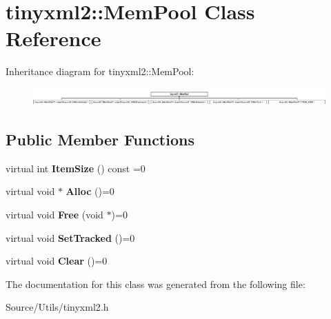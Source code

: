 \hypertarget{classtinyxml2_1_1_mem_pool}{}\section{tinyxml2\+:\+:Mem\+Pool Class Reference}
\label{classtinyxml2_1_1_mem_pool}
Inheritance diagram for tinyxml2\+:\+:Mem\+Pool\+:\begin{figure}[H]
\begin{center}
\leavevmode
\includegraphics[height=0.691358cm]{classtinyxml2_1_1_mem_pool}
\end{center}
\end{figure}
\subsection*{Public Member Functions}
\begin{DoxyCompactItemize}
\item 
\mbox{\label{classtinyxml2_1_1_mem_pool_a0c518d49e3a94bde566f61e13b7240bb}} 
virtual int {\bfseries Item\+Size} () const =0
\item 
\mbox{\label{classtinyxml2_1_1_mem_pool_a4f977b5fed752c0bbfe5295f469d6449}} 
virtual void $\ast$ {\bfseries Alloc} ()=0
\item 
\mbox{\label{classtinyxml2_1_1_mem_pool_a49e3bfac2cba2ebd6776b31e571f64f7}} 
virtual void {\bfseries Free} (void $\ast$)=0
\item 
\mbox{\label{classtinyxml2_1_1_mem_pool_ac5804dd1387b2e4de5eef710076a0db1}} 
virtual void {\bfseries Set\+Tracked} ()=0
\item 
\mbox{\label{classtinyxml2_1_1_mem_pool_a74fcdef9756917c8ae19fbbb4d658ed7}} 
virtual void {\bfseries Clear} ()=0
\end{DoxyCompactItemize}


The documentation for this class was generated from the following file\+:\begin{DoxyCompactItemize}
\item 
Source/\+Utils/tinyxml2.\+h\end{DoxyCompactItemize}
